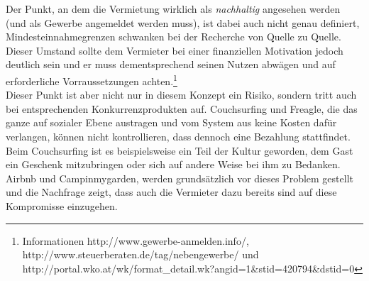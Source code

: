 Der Punkt, an dem die Vermietung wirklich als \textit{nachhaltig} angesehen werden (und als Gewerbe angemeldet werden muss), ist dabei auch nicht genau definiert, Mindesteinnahmegrenzen schwanken bei der Recherche  von Quelle zu Quelle. Dieser Umstand sollte dem Vermieter bei einer finanziellen Motivation jedoch deutlich sein und er muss dementsprechend seinen Nutzen abwägen und auf erforderliche Vorraussetzungen achten.\footnote{Informationen http://www.gewerbe-anmelden.info/, http://www.steuerberaten.de/tag/nebengewerbe/ und http://portal.wko.at/wk/format\_detail.wk?angid=1\&stid=420794\&dstid=0}\\

Dieser Punkt ist aber nicht nur in diesem Konzept ein Risiko, sondern tritt auch bei entsprechenden Konkurrenzprodukten auf. Couchsurfing und Freagle, die das ganze auf sozialer Ebene austragen und vom System aus keine Kosten dafür verlangen, können nicht kontrollieren, dass dennoch eine Bezahlung stattfindet. Beim Couchsurfing ist es beispielsweise ein Teil der Kultur geworden, dem Gast ein Geschenk mitzubringen oder sich auf andere Weise bei ihm zu Bedanken. Airbnb und Campinmygarden, werden grundsätzlich vor dieses Problem gestellt und die Nachfrage zeigt, dass auch die Vermieter dazu bereits sind auf diese Kompromisse einzugehen. 




